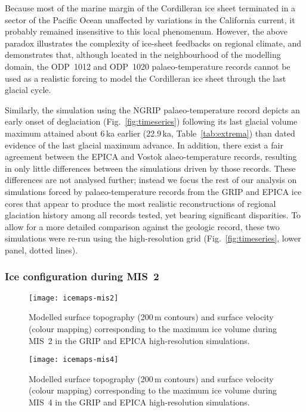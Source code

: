 \documentclass[tc]{copernicus}
\begin{document}
Because most of the marine margin of the Cordilleran ice sheet terminated in a
sector of the Pacific Ocean unaffected by variations in the California current,
it probably remained insensitive to this local phenomenum. However, the above
paradox
illustrates the complexity of ice-sheet feedbacks on regional climate, and
demonstrates that, although located in the neighbourhood of the modelling
domain, the ODP~1012 and ODP~1020 palaeo-temperature records cannot be
used as a realistic forcing to model the Cordilleran ice sheet
through the last glacial cycle.

Similarly, the simulation using the NGRIP palaeo-temperature record depicts an
early onset of deglaciation (Fig.~\ref{fig:timeseries}) following its last
glacial volume maximum attained about 6\,ka earlier (22.9\,ka,
Table~\ref{tab:extrema}) than dated evidence of the last glacial maximum
advance. In addition, there exist a fair agreement between the EPICA and Vostok
alaeo-temperature records, resulting in only little differences between the
simulations driven by those records. These differences are not analysed
further; instead we focus the rest of our analysis on simulations forced by
palaeo-temperature records from the GRIP and EPICA ice cores that appear to
produce the most realistic reconstructions of regional glaciation history among
all records tested, yet bearing significant disparities. To allow for a more
detailed comparison against the geologic record, these two simulations were
re-run using the high-resolution grid (Fig.~\ref{fig:timeseries}, lower panel,
dotted lines).


\subsubsection{Ice configuration during MIS~2}
\label{sec:mis2}

\begin{figure*}
  \texttt{[image: icemaps-mis2]}
  \caption{Modelled surface topography (200\,m contours) and surface velocity
           (colour mapping) corresponding to the maximum ice volume during
           MIS~2 in the GRIP and EPICA high-resolution simulations.}
  \label{fig:mis2}
\end{figure*}

\begin{figure*}
  \texttt{[image: icemaps-mis4]}
  \caption{Modelled surface topography (200\,m contours) and surface velocity
           (colour mapping) corresponding to the maximum ice volume during
           MIS~4 in the GRIP and EPICA high-resolution simulations.}
  \label{fig:mis4}
\end{figure*}
\end{document}
